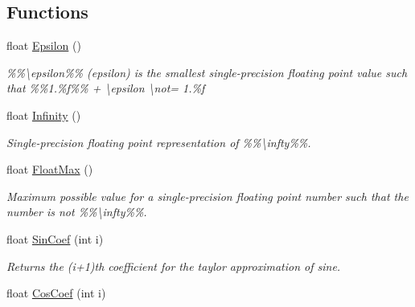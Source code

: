 \subsection*{Functions}
\begin{DoxyCompactItemize}
\item 
\hypertarget{group___scalar_math_consts_ga88a517d09326cefa42e5a854384217dd}{}float \hyperlink{group___scalar_math_consts_ga88a517d09326cefa42e5a854384217dd}{Epsilon} ()\label{group___scalar_math_consts_ga88a517d09326cefa42e5a854384217dd}

\begin{DoxyCompactList}\small\item\em \%\%\textbackslash{}epsilon\%\% (epsilon) is the smallest single-\/precision floating point value such that \%\%1.\%f\%\% + \textbackslash{}epsilon \textbackslash{}not= 1.\%f \end{DoxyCompactList}\item 
\hypertarget{group___scalar_math_consts_ga06bd81da4df7e94c91fbd777f208f000}{}float \hyperlink{group___scalar_math_consts_ga06bd81da4df7e94c91fbd777f208f000}{Infinity} ()\label{group___scalar_math_consts_ga06bd81da4df7e94c91fbd777f208f000}

\begin{DoxyCompactList}\small\item\em Single-\/precision floating point representation of \%\%\textbackslash{}infty\%\%. \end{DoxyCompactList}\item 
\hypertarget{group___scalar_math_consts_ga6a01ee138954aa627264187944f9b636}{}float \hyperlink{group___scalar_math_consts_ga6a01ee138954aa627264187944f9b636}{Float\+Max} ()\label{group___scalar_math_consts_ga6a01ee138954aa627264187944f9b636}

\begin{DoxyCompactList}\small\item\em Maximum possible value for a single-\/precision floating point number such that the number is not \%\%\textbackslash{}infty\%\%. \end{DoxyCompactList}\item 
\hypertarget{group___scalar_math_consts_gaee3e576be53b2e48bc14cb4779197d48}{}float \hyperlink{group___scalar_math_consts_gaee3e576be53b2e48bc14cb4779197d48}{Sin\+Coef} (int i)\label{group___scalar_math_consts_gaee3e576be53b2e48bc14cb4779197d48}

\begin{DoxyCompactList}\small\item\em Returns the (i+1)th coefficient for the taylor approximation of sine. \end{DoxyCompactList}\item 
\hypertarget{group___scalar_math_consts_ga6ed06be895b61252517cb57df1f83ffa}{}float \hyperlink{group___scalar_math_consts_ga6ed06be895b61252517cb57df1f83ffa}{Cos\+Coef} (int i)\label{group___scalar_math_consts_ga6ed06be895b61252517cb57df1f83ffa}


\end{DoxyCompactItemize}
